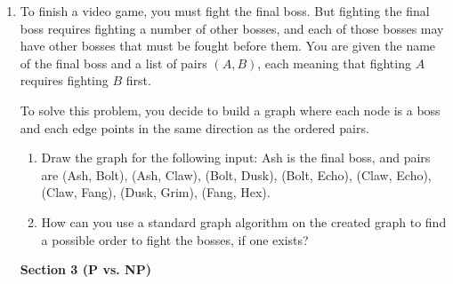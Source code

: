 \documentclass[11pt]{article}
\begin{document}
\begin{enumerate}
Reduce this problem
to a standard reachability problem on a new graph $G'$ and apply
whatever-first search (WFS) as a black box. (That is, you may not modify WFS at all.)
Your goal is an $O(n + m)$-time algorithm. \textbf{Answer the following to describe your algorithm.}
\begin{itemize}
    \setlength{\itemsep}{60pt}
\item What are the vertices of $G'$ in relation to $G$?  What does each vertex represent?
\item What are the edges of $G'$ in relation to $G$?  Are they directed or undirected?
\item If the vertices and/or edges have associated values, what are they?
\item What is the precise relationship between your graph $G'$ and the stated problem?
\item You must use WFS to solve the problem. What do you call it on, and how do you
interpret the result?
\item Describe and justify the running time of your entire algorithm,
\emph{including} the time to build $G'$, \emph{as a function of the original
input parameters}.
\end{itemize}

\newpage

\item To finish a video game, you must fight the final boss. But fighting the final
boss requires fighting a number of other bosses, and each of those bosses may have
other bosses that must be fought before them.
You are given the name of the final boss and a list of
pairs \((A,B)\), each meaning that fighting \(A\) requires fighting \(B\) first.

To solve this problem, you decide to build a graph where each node is a boss and
each edge points in the same direction as the ordered pairs.

\begin{enumerate}
    \item Draw the graph for the following input: Ash is the final boss, and
    pairs are (Ash, Bolt), (Ash, Claw), (Bolt, Dusk), (Bolt, Echo), (Claw,
    Echo), (Claw, Fang), (Dusk, Grim), (Fang, Hex).
    \vspace{2in}
    \item How can you use a standard graph algorithm on the created graph to find
    a possible order to fight the bosses, if one exists?
\end{enumerate}
\newpage
\begin{center}
\LARGE\textbf{Section 3 (P vs. NP)\\}%
\end{center}


\end{enumerate}
\end{document}
